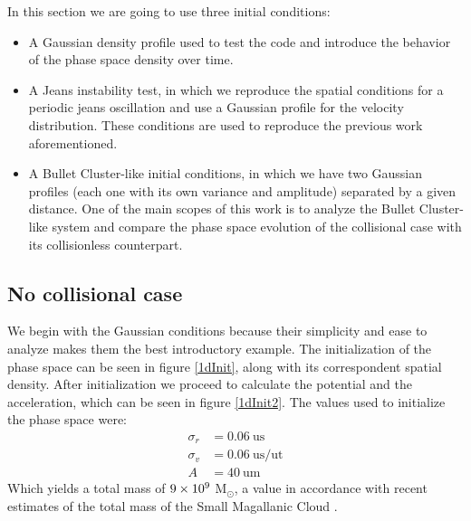 In this section we are going to use three initial conditions:
\begin{itemize}
\item A Gaussian density profile used to test the code and introduce the behavior of the phase space density over time.
\item A Jeans instability test, in which we reproduce the spatial conditions for a periodic jeans oscillation and use a Gaussian profile for the velocity distribution. These conditions are used to reproduce the previous work aforementioned. 
\item A Bullet Cluster-like initial conditions, in which we have two Gaussian profiles (each one with its own variance and amplitude) separated by a given distance. One of the main scopes of this work is to analyze the Bullet Cluster-like system and compare the phase space evolution of the collisional case with its collisionless counterpart.
\end{itemize}
\subsection{No collisional case}
We begin with the Gaussian conditions because their simplicity and ease to analyze makes them the best introductory example.
The initialization of the phase space can be seen in figure \ref{1dInit}, along with its correspondent spatial density.
After initialization we proceed to calculate the potential and the acceleration, which can be seen in figure \ref{1dInit2}.
The values used to initialize the phase space were:
\begin{align}
\sigma_r &= 0.06 \ \text{us} \\
\sigma_v &= 0.06 \ \text{us} / \text{ut} \\
A &= 40  \ \text{um}
\end{align} 
Which yields a total mass of $9 \times 10^{9}$ M$_{\odot}$, a value in accordance with recent estimates of the total mass of the Small Magallanic Cloud \cite{2009MNRAS395342B}. 

